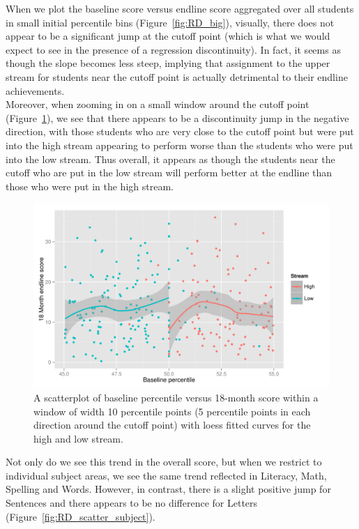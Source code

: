 \documentclass[11pt]{article}
\begin{document}
When we plot the baseline score versus endline score aggregated over all students in small initial percentile bins (Figure~\ref{fig:RD_big}), visually, there does not appear to be a significant jump at the cutoff point (which is what we would expect to see in the presence of a regression discontinuity). In fact, it seems as though the slope becomes less steep, implying that assignment to the upper stream for students near the cutoff point is actually detrimental to their endline achievements.\\

 
Moreover, when zooming in on a small window around the cutoff point (Figure~\ref{fig:RD_scatter}), we see that there appears to be a discontinuity jump in the negative direction, with those students who are very close to the cutoff point but were put into the high stream appearing to perform worse than the students who were put into the low stream. Thus overall, it appears as though the students near the cutoff who are put in the low stream will perform better at the endline than those who were put in the high stream.



  \begin{figure}[ht]
 \centering
 \includegraphics[scale=0.54]{RD_scatter.pdf}
 \caption{A scatterplot of baseline percentile versus 18-month score within a window of width 10 percentile points (5 percentile points in each direction around the cutoff point) with loess fitted curves for the high and low stream.}
 \label{fig:RD_scatter}
 \end{figure}
 
 Not only do we see this trend in the overall score, but when we restrict to individual subject areas, we see the same trend reflected in Literacy, Math, Spelling and Words. However, in contrast, there is a slight positive jump for Sentences and there appears to be no difference for Letters (Figure~\ref{fig:RD_scatter_subject}). \\
 
\end{document}
